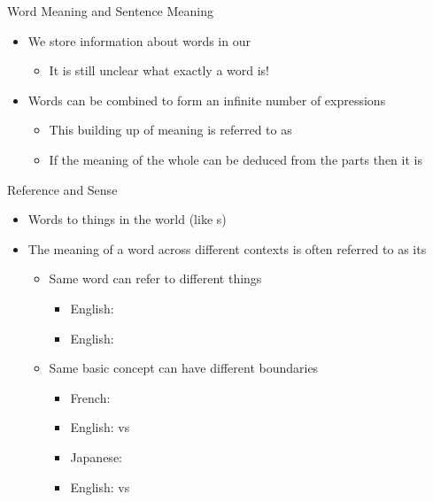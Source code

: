 \begin{frame}{Word Meaning and Sentence Meaning}

\begin{itemize}
\item We store information about words in our 
  \begin{itemize}
  \item It is still unclear what exactly a word is!
  \end{itemize}
\item Words can be combined to form an infinite number of expressions
  \begin{itemize}
  \item This building up of meaning is referred to as 
  \item If the meaning of the whole can be deduced from the parts then it is 
  \end{itemize}
\end{itemize}
\end{frame}

\begin{frame}{Reference and Sense}

\begin{itemize}
\item Words  to things in the world (like s)
\item The meaning of a word across different contexts is often referred to as its 
  \begin{itemize}
  \item Same word can refer to different things
    \begin{itemize}
    \item English: 
    \item English: 
    \end{itemize}
  \item Same basic concept can have different boundaries
    \begin{itemize}
    \item French: 
    \item English:  vs 
      
    \item Japanese: 
    \item English:  vs 
    \end{itemize}
  \end{itemize}
\end{itemize}



\end{frame}

